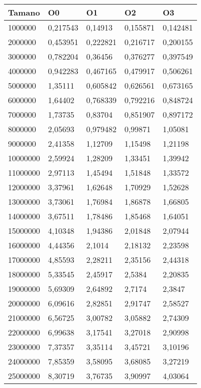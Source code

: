 \begin{tabular}{|l|l|l|l|l|}
	\hline
	Tamano & O0 & O1 & O2 & O3 \\
	\hline
	\hline
	1000000 & 0,217543 & 0,14913 & 0,155871 & 0,142481 \\
	\hline
	2000000 & 0,453951 & 0,222821 & 0,216717 & 0,200155 \\
	\hline
	3000000 & 0,782204 & 0,36456 & 0,376277 & 0,397549 \\
	\hline
	4000000 & 0,942283 & 0,467165 & 0,479917 & 0,506261 \\
	\hline
	5000000 & 1,35111 & 0,605842 & 0,626561 & 0,673165 \\
	\hline
	6000000 & 1,64402 & 0,768339 & 0,792216 & 0,848724 \\
	\hline
	7000000 & 1,73735 & 0,83704 & 0,851907 & 0,897172 \\
	\hline
	8000000 & 2,05693 & 0,979482 & 0,99871 & 1,05081 \\
	\hline
	9000000 & 2,41358 & 1,12709 & 1,15498 & 1,21198 \\
	\hline
	10000000 & 2,59924 & 1,28209 & 1,33451 & 1,39942 \\
	\hline
	11000000 & 2,97113 & 1,45494 & 1,51848 & 1,33572 \\
	\hline
	12000000 & 3,37961 & 1,62648 & 1,70929 & 1,52628 \\
	\hline
	13000000 & 3,73061 & 1,76984 & 1,86878 & 1,66805 \\
	\hline
	14000000 & 3,67511 & 1,78486 & 1,85468 & 1,64051 \\
	\hline
	15000000 & 4,10348 & 1,94386 & 2,01848 & 2,07944 \\
	\hline
	16000000 & 4,44356 & 2,1014 & 2,18132 & 2,23598 \\
	\hline
	17000000 & 4,85593 & 2,28211 & 2,35156 & 2,44318 \\
	\hline
	18000000 & 5,33545 & 2,45917 & 2,5384 & 2,20835 \\
	\hline
	19000000 & 5,69309 & 2,64892 & 2,7174 & 2,3847 \\
	\hline
	20000000 & 6,09616 & 2,82851 & 2,91747 & 2,58527 \\
	\hline
	21000000 & 6,56725 & 3,00782 & 3,05882 & 2,74309 \\
	\hline
	22000000 & 6,99638 & 3,17541 & 3,27018 & 2,90998 \\
	\hline
	23000000 & 7,37357 & 3,35114 & 3,45721 & 3,10196 \\
	\hline
	24000000 & 7,85359 & 3,58095 & 3,68085 & 3,27219 \\
	\hline
	25000000 & 8,30719 & 3,76735 & 3,90997 & 4,03064 \\
	\hline
\end{tabular}
